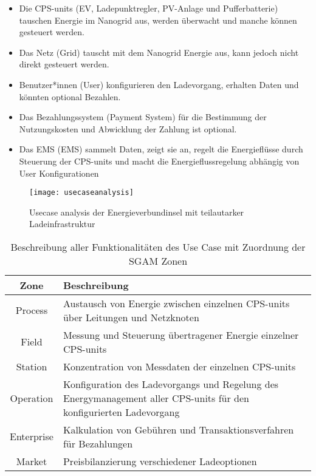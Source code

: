 		\begin{itemize}
			\item Die CPS-units (EV, Ladepunktregler, PV-Anlage und Pufferbatterie) tauschen Energie im Nanogrid aus, werden überwacht und manche können gesteuert werden.
			\item Das Netz (Grid) tauscht mit dem Nanogrid Energie aus, kann jedoch nicht direkt gesteuert werden. 
			\item Benutzer*innen (User) konfigurieren den Ladevorgang, erhalten Daten und könnten optional Bezahlen.
			\item Das Bezahlungssystem (Payment System) für die Bestimmung der Nutzungskosten und Abwicklung der Zahlung ist optional.
			\item Das EMS (EMS) sammelt Daten, zeigt sie an, regelt die Energieflüsse durch Steuerung der CPS-units und macht die Energieflussregelung abhängig von User Konfigurationen
		\end{itemize}  

		\begin{figure}
			\centering
			\texttt{[image: usecaseanalysis]}
			\caption{Usecase analysis der Energieverbundinsel mit teilautarker Ladeinfrastruktur}
			\label{Abb:usecaseanalysis}
		\end{figure} 
	

		\begin{table}
			\begin{tabularx}{\linewidth}{|c|X|}
				\hline 
				Zone & Beschreibung   \\ 
				\hline 
				Process 	& Austausch von Energie zwischen einzelnen CPS-units über Leitungen und Netzknoten \\ 
				\hline 
				Field 		& Messung und Steuerung übertragener Energie einzelner CPS-units \\
				\hline
				Station 	& Konzentration von Messdaten der einzelnen CPS-units \\
				\hline
				Operation 	& Konfiguration des Ladevorgangs und Regelung des Energymanagement aller CPS-units für den konfigurierten Ladevorgang \\
				\hline
				Enterprise 	& Kalkulation von Gebühren und Transaktionsverfahren für Bezahlungen \\
				\hline
				Market 		& Preisbilanzierung verschiedener Ladeoptionen \\
				\hline 
			\end{tabularx} 
			\caption{Beschreibung aller Funktionalitäten des Use Case mit Zuordnung der SGAM Zonen}
			\label{Tab:usecase_zones}
		\end{table}	
				
